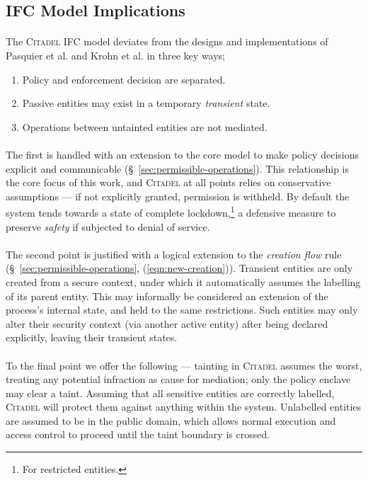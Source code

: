 \subsection{IFC Model Implications}
\label{sec:ifc-model-implications}

\paragraph{} The \textsc{Citadel} IFC model deviates from the designs and implementations of Pasquier et al. and Krohn et al. in three key ways;
\begin{enumerate}
    \item Policy and enforcement decision are separated.
    \item Passive entities may exist in a temporary \textit{transient} state.
    \item Operations between untainted entities are not mediated.
\end{enumerate}

\paragraph{} The first is handled with an extension to the core model to make policy decisions explicit and communicable (§~\ref{sec:permissible-operations}). This relationship is the core focus of this work, and \textsc{Citadel} at all points relies on conservative assumptions --- if not explicitly granted, permission is withheld. By default the system tends towards a state of complete lockdown,\footnote{For restricted entities.} a defensive measure to preserve \textit{safety} if subjected to denial of service.

\paragraph{} The second point is justified with a logical extension to the \textit{creation flow} rule (§~\ref{sec:permissible-operations}, (\ref{eqn:new-creation})). Transient entities are only created from a secure context, under which it automatically assumes the labelling of its parent entity. This may informally be considered an extension of the process's internal state, and held to the same restrictions. Such entities may only alter their security context (via another active entity) after being declared explicitly, leaving their transient states. 

\paragraph{} To the final point we offer the following --- tainting in \textsc{Citadel} assumes the worst, treating any potential infraction as cause for mediation; only the policy enclave may clear a taint. Assuming that all sensitive entities are correctly labelled, \textsc{Citadel} will protect them against anything within the system. Unlabelled entities are assumed to be in the public domain, which allows normal execution and access control to proceed until the taint boundary is crossed.


